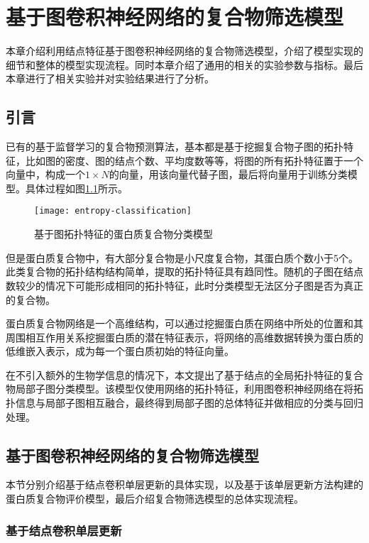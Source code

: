\chapter{基于图卷积神经网络的复合物筛选模型}
\label{chapter:NodeConv}

本章介绍利用结点特征基于图卷积神经网络的复合物筛选模型，介绍了模型实现的细节和整体的模型实现流程。同时本章介绍了通用的相关的实验参数与指标。最后本章进行了相关实验并对实验结果进行了分析。

\section{引言}
\label{section:NodeConv:Put}

已有的基于监督学习的复合物预测算法，基本都是基于挖掘复合物子图的拓扑特征，比如图的密度、图的结点个数、平均度数等等，将图的所有拓扑特征置于一个向量中，构成一个$1\times N$的向量，用该向量代替子图，最后将向量用于训练分类模型。具体过程如图\ref{fig:entropy-classification}所示。

\begin{figure}[htbp]
    \centering
    \texttt{[image: entropy-classification]}
    \caption{基于图拓扑特征的蛋白质复合物分类模型}
    \label{fig:entropy-classification}
\end{figure}


但是蛋白质复合物中，有大部分复合物是小尺度复合物，其蛋白质个数小于5个。此类复合物的拓扑结构结构简单，提取的拓扑特征具有趋同性。随机的子图在结点数较少的情况下可能形成相同的拓扑特征，此时分类模型无法区分子图是否为真正的复合物。

蛋白质复合物网络是一个高维结构，可以通过挖掘蛋白质在网络中所处的位置和其周围相互作用关系挖掘蛋白质的潜在特征表示，将网络的高维数据转换为蛋白质的低维嵌入表示，成为每一个蛋白质初始的特征向量。

在不引入额外的生物学信息的情况下，本文提出了基于结点的全局拓扑特征的复合物局部子图分类模型。该模型仅使用网络的拓扑特征，利用图卷积神经网络在将拓扑信息与局部子图相互融合，最终得到局部子图的总体特征并做相应的分类与回归处理。

\section{基于图卷积神经网络的复合物筛选模型}
\label{section:NodeConv:detail}

本节分别介绍基于结点卷积单层更新的具体实现，以及基于该单层更新方法构建的蛋白质复合物评价模型，最后介绍复合物筛选模型的总体实现流程。

\subsection{基于结点卷积单层更新}

